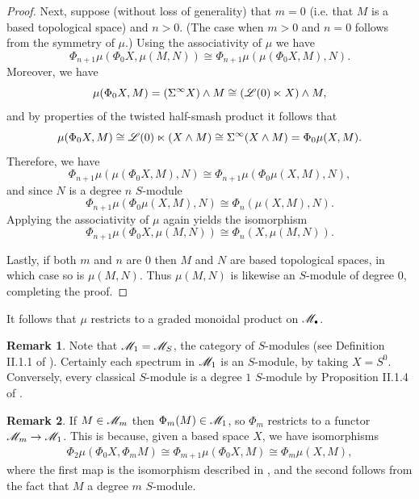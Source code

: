 \documentclass[openany, amssymb, psamsfonts]{amsart}
\theoremstyle{definition}
\newtheorem{rem}{Remark}[section]
\numberwithin{equation}{section}
\begin{document}
\begin{proof}
    Next, suppose (without loss of generality) that $m = 0$ (i.e. that $M$ is a based topological space) and $n > 0$. (The case when $m > 0$ and $n = 0$ follows from the symmetry of $\mu$.) Using the associativity of $\mu$ we have 
    \begin{equation*}
        \Phi_{n + 1}\mu(\Phi_0 X, \mu(M, N)) \cong \Phi_{n + 1}\mu(\mu(\Phi_0 X, M), N).
    \end{equation*} Moreover, we have
    \begin{equation*}
        \mu(\Phi_0 X, M) = (\Sigma^\infty X) \wedge M \cong (\mathscr{L}(0) \ltimes X) \wedge M,
    \end{equation*} and by properties of the twisted half-smash product it follows that
    \begin{equation*}
        \mu(\Phi_0 X, M) \cong \mathscr{L}(0) \ltimes (X \wedge M) \cong \Sigma^\infty(X \wedge M) = \Phi_0\mu(X, M).
    \end{equation*} Therefore, we have
    \begin{equation*}
        \Phi_{n + 1}\mu(\mu(\Phi_0 X, M), N) \cong \Phi_{n + 1}\mu(\Phi_0\mu(X, M), N),
    \end{equation*} and since $N$ is a degree $n$ $S$-module
    \begin{equation*}
        \Phi_{n + 1}\mu(\Phi_0\mu(X, M), N) \cong \Phi_n(\mu(X, M), N).
    \end{equation*} Applying the associativity of $\mu$ again yields the isomorphism
    \begin{equation*}
        \Phi_{n + 1}\mu(\Phi_0 X, \mu(M, N)) \cong \Phi_n(X, \mu(M, N)).
    \end{equation*}

    Lastly, if both $m$ and $n$ are $0$ then $M$ and $N$ are based topological spaces, in which case so is $\mu(M, N)$. Thus $\mu(M, N)$ is likewise an $S$-module of degree $0$, completing the proof.
\end{proof}

It follows that $\mu$ restricts to a graded monoidal product on $\scM_\sbull$.

\begin{rem}
    Note that $\mathscr{M}_1 = \mathscr{M}_S$, the category of $S$-modules (see Definition II.1.1 of \cite{EKMM}). Certainly each spectrum in $\mathscr{M}_1$ is an $S$-module, by taking $X = S^0$. Conversely, every classical $S$-module is a degree $1$ $S$-module by Proposition II.1.4 of \cite{EKMM}.
\end{rem}

\begin{rem}
    If $M \in \mathscr{M}_m$ then $\Phi_m(M) \in \mathscr{M}_1$, so $\Phi_m$ restricts to a functor $\mathscr{M}_m \to \mathscr{M}_1$. This is because, given a based space $X$, we have isomorphisms
    \begin{align*}
        \Phi_{2}\mu(\Phi_0 X, \Phi_m M) \cong \Phi_{m + 1}\mu(\Phi_0 X, M) \cong \Phi_m\mu(X, M),
    \end{align*} where the first map is the isomorphism described in , and the second follows from the fact that $M$ a degree $m$ $S$-module.
\end{rem}
\end{document}
